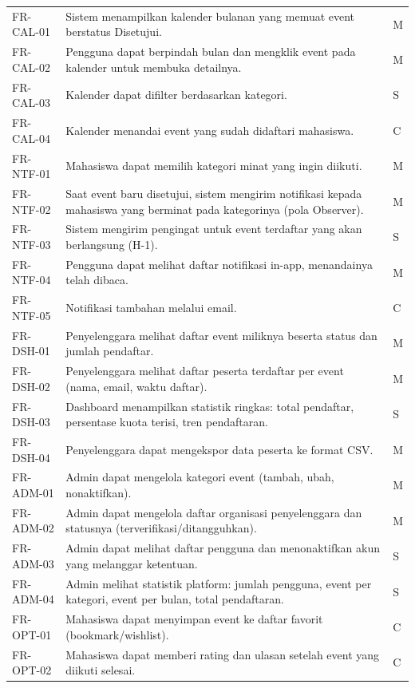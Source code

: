 \documentclass[11pt,a4paper]{article}
\begin{document}
\begin{longtable}{p{2.8cm}p{10.7cm}p{.5cm}}
FR-CAL-01 & Sistem menampilkan kalender bulanan yang memuat event berstatus Disetujui. & M\\
FR-CAL-02 & Pengguna dapat berpindah bulan dan mengklik event pada kalender untuk membuka detailnya. & M\\
FR-CAL-03 & Kalender dapat difilter berdasarkan kategori. & S\\
FR-CAL-04 & Kalender menandai event yang sudah didaftari mahasiswa. & C\\
FR-NTF-01 & Mahasiswa dapat memilih kategori minat yang ingin diikuti. & M\\
FR-NTF-02 & Saat event baru disetujui, sistem mengirim notifikasi kepada mahasiswa yang berminat pada kategorinya (pola Observer). & M\\
FR-NTF-03 & Sistem mengirim pengingat untuk event terdaftar yang akan berlangsung (H-1). & S\\
FR-NTF-04 & Pengguna dapat melihat daftar notifikasi in-app, menandainya telah dibaca. & M\\
FR-NTF-05 & Notifikasi tambahan melalui email. & C\\
FR-DSH-01 & Penyelenggara melihat daftar event miliknya beserta status dan jumlah pendaftar. & M\\
FR-DSH-02 & Penyelenggara melihat daftar peserta terdaftar per event (nama, email, waktu daftar). & M\\
FR-DSH-03 & Dashboard menampilkan statistik ringkas: total pendaftar, persentase kuota terisi, tren pendaftaran. & S\\
FR-DSH-04 & Penyelenggara dapat mengekspor data peserta ke format CSV. & M\\
FR-ADM-01 & Admin dapat mengelola kategori event (tambah, ubah, nonaktifkan). & M\\
FR-ADM-02 & Admin dapat mengelola daftar organisasi penyelenggara dan statusnya (terverifikasi/ditangguhkan). & M\\
FR-ADM-03 & Admin dapat melihat daftar pengguna dan menonaktifkan akun yang melanggar ketentuan. & S\\
FR-ADM-04 & Admin melihat statistik platform: jumlah pengguna, event per kategori, event per bulan, total pendaftaran. & S\\
FR-OPT-01 & Mahasiswa dapat menyimpan event ke daftar favorit (bookmark/wishlist). & C\\
FR-OPT-02 & Mahasiswa dapat memberi rating dan ulasan setelah event yang diikuti selesai. & C\\
\end{longtable}\normalsize
\end{document}
